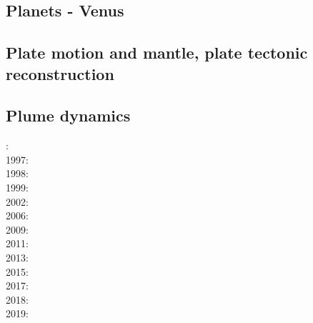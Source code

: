 \subsection*{Planets - Venus}

\cite{scbg90}
\cite{kiha92}
\cite{somo96}
\cite{mazk98}\cite{moso98}
\cite{vavv05}
\cite{arta12}
\cite{gita14}
\cite{gery14b}
\cite{cram17}\cite{dast17}
\cite{king18}



\subsection*{Plate motion and mantle, plate tectonic reconstruction}

\noindent
\cite{mcse73}
\cite{zieg92a}
\cite{zhgm98}
\cite{evan03}\cite{reta03}
\cite{lizh09}\cite{vasv09}
\cite{huss12}\cite{gutz12}
\cite{mosq13}
\cite{yoha15}
\cite{tewg19}

\subsection*{Plume dynamics}

: \cite{nasf94}\cite{hayu94}\\
1997: \cite{vank97}\\
1998: \cite{thta98}\\
1999: \cite{lays99}\\
2002: \cite{falt02}\cite{dagl02}\\
2006: \cite{isst06}\cite{liva06a}\cite{liva06b}\cite{zhon06}\cite{mita06}\cite{nokm06}\\
2009: \cite{vavl09}\\
2011: \cite{toyu11}\cite{talz11}\cite{burk11}\cite{memm11}\cite{dalt11}\\
2013: \cite{dagm13}\cite{madd13}\cite{ande13}\\
2015: \cite{daso15}\cite{hafg15}\\
2017: \cite{zhli17}\\
2018: \cite{dacc18}\\
2019: \cite{argc19}

